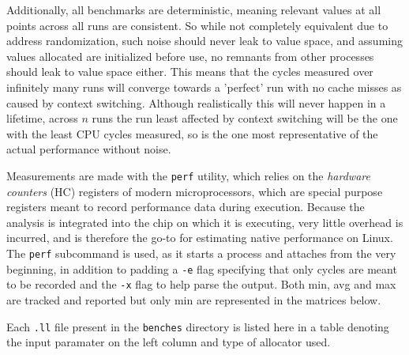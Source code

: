 \documentclass{article}
\begin{document}
Additionally, all benchmarks are deterministic, meaning relevant values at all points across all runs are consistent.
So while not completely equivalent due to address randomization, such noise should never leak to value space, and assuming values allocated are initialized before use, no remnants from other processes should leak to value space either.  %
This means that the cycles measured over infinitely many runs will converge towards a 'perfect' run with no cache misses as caused by context switching.
Although realistically this will never happen in a lifetime, across \(n\) runs the run least affected by context switching will be the one with the least CPU cycles measured, so is the one most representative of the actual performance without noise.

Measurements are made with the \lstinline!perf! utility, which relies on the \textit{hardware counters} (HC) registers of modern microprocessors, which are special purpose registers meant to record performance data during execution. Because the analysis is integrated into the chip on which it is executing, very little overhead is incurred, and is therefore the go-to for estimating native performance on Linux. The \lstinline!perf! subcommand is used, as it starts a process and attaches from the very beginning, in addition to padding a \lstinline!-e! flag specifying that only cycles are meant to be recorded and the \lstinline!-x! flag to help parse the output. Both min, avg and max are tracked and reported but only min are represented in the matrices below.

Each \lstinline!.ll! file present in the \lstinline!benches! directory is listed here in a table denoting the input paramater on the left column and type of allocator used.


%







\end{document}
